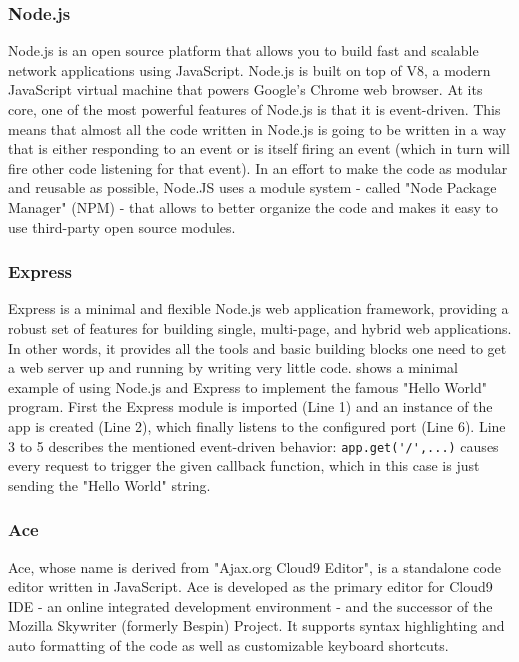 \subsubsection{Node.js}
Node.js is an open source platform that allows you to build fast and scalable network applications using JavaScript. Node.js is built on top of V8, a modern JavaScript virtual machine that powers Google's Chrome web browser. At its core, one of the most powerful features of Node.js is that it is event-driven. This means that almost all the code written in Node.js is going to be written in a way that is either responding to an event or is itself firing an event (which in turn will fire other code listening for that event). In an effort to make the code as modular and reusable as possible, Node.JS uses a module system - called  "Node Package Manager" (NPM) - that allows to better organize the code and makes it easy to use third-party open source modules.

\subsubsection{Express}
Express is a minimal and flexible Node.js web application framework, providing a robust set of features for building single, multi-page, and hybrid web applications. In other words, it provides all the tools and basic building blocks one need to get a web server up and running by writing very little code.  shows a minimal example of using Node.js and Express to implement the famous "Hello World" program. First the Express module is imported (Line 1) and an instance of the app is created (Line 2), which finally listens to the configured port (Line 6). Line 3 to 5 describes the mentioned event-driven behavior: \lstinline!app.get('/',...)! causes every request to trigger the given callback function, which in this case is just sending the "Hello World" string.

\begin{figure}[htbp]
	
\end{figure}

\subsubsection{Ace}
Ace, whose name is derived from "Ajax.org Cloud9 Editor", is a standalone code editor written in JavaScript. Ace is developed as the primary editor for Cloud9 IDE - an online integrated development environment -  and the successor of the Mozilla Skywriter (formerly Bespin) Project. It supports syntax highlighting and auto formatting of the code as well as customizable keyboard shortcuts.

